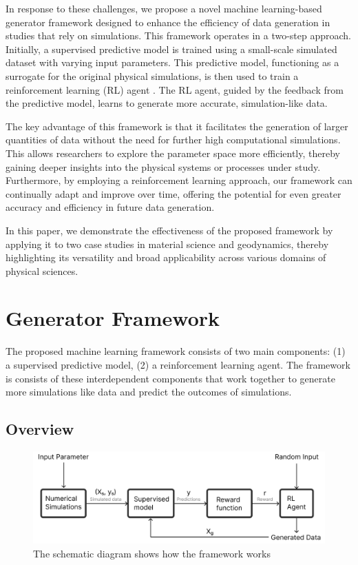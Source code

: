 \documentclass{article}
\begin{document}
In response to these challenges, we propose a novel machine learning-based generator framework designed to enhance the efficiency of data generation in studies that rely on simulations. This framework operates in a two-step approach. Initially, a supervised predictive model is trained using a small-scale simulated dataset with varying input parameters. This predictive model, functioning as a surrogate for the original physical simulations, is then used to train a reinforcement learning (RL) agent \cite{sutton2018reinforcement}. The RL agent, guided by the feedback from the predictive model, learns to generate more accurate, simulation-like data.

The key advantage of this framework is that it facilitates the generation of larger quantities of data without the need for further high computational simulations. This allows researchers to explore the parameter space more efficiently, thereby gaining deeper insights into the physical systems or processes under study. Furthermore, by employing a reinforcement learning approach, our framework can continually adapt and improve over time, offering the potential for even greater accuracy and efficiency in future data generation.

In this paper, we demonstrate the effectiveness of the proposed framework by applying it to two case studies in material science and geodynamics, thereby highlighting its versatility and broad applicability across various domains of physical sciences.

\section{Generator Framework}

The proposed machine learning framework consists of two main components: (1) a supervised predictive model, (2) a reinforcement learning agent. The framework is consists of these interdependent components that work together to generate more simulations like data and predict the outcomes of simulations.

\subsection{Overview}

\begin{figure}[!h]
    \begin{center}
        \includegraphics[scale=0.60]{figures/framework.png}
    \end{center}
    \caption{The schematic diagram shows how the framework works}
    \label{fig:framework-diagram}
\end{figure}
\end{document}
